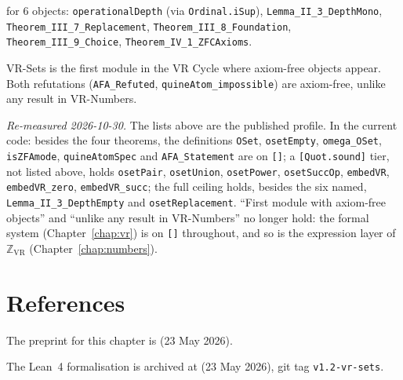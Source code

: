  for 6 objects:
\texttt{operationalDepth} (via \texttt{Ordinal.iSup}),
\texttt{Lemma\_II\_3\_DepthMono},
\texttt{Theorem\_III\_7\_Replacement},
\texttt{Theorem\_III\_8\_Foundation},
\texttt{Theorem\_III\_9\_Choice},
\texttt{Theorem\_IV\_1\_ZFCAxioms}.

VR-Sets is the first module in the VR Cycle where axiom-free objects
appear.  Both refutations (\texttt{AFA\_Refuted},
\texttt{quineAtom\_impossible}) are axiom-free, unlike any result in
VR-Numbers.

\emph{Re-measured 2026-10-30.}  The lists above are the published profile.  In the
current code: besides the four theorems, the definitions \texttt{OSet},
\texttt{osetEmpty}, \texttt{omega\_OSet}, \texttt{isZFAmode}, \texttt{quineAtomSpec}
and \texttt{AFA\_Statement} are on \texttt{[]}; a \texttt{[Quot.sound]} tier, not listed
above, holds \texttt{osetPair}, \texttt{osetUnion}, \texttt{osetPower},
\texttt{osetSuccOp}, \texttt{embedVR}, \texttt{embedVR\_zero}, \texttt{embedVR\_succ};
the full ceiling holds, besides the six named, \texttt{Lemma\_II\_3\_DepthEmpty} and
\texttt{osetReplacement}.  ``First module with axiom-free objects'' and ``unlike any
result in VR-Numbers'' no longer hold: the formal system (Chapter~\ref{chap:vr}) is on
\texttt{[]} throughout, and so is the expression layer of $\mathbb{Z}_{\mathrm{VR}}$
(Chapter~\ref{chap:numbers}).

\section{References}
\label{sec:sets_refs}

The preprint for this chapter is
 (23 May 2026).

The Lean~4 formalisation is archived at
 (23 May 2026),
git tag \texttt{v1.2-vr-sets}.
